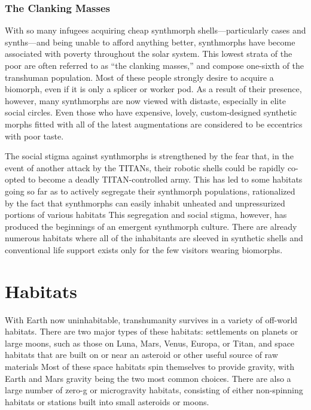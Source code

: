 \subsubsection{The Clanking Masses}

With so many infugees acquiring cheap synthmorph 
shells—particularly cases and synths—and being 
unable to afford anything better, synthmorphs have 
become associated with poverty throughout the solar 
system. This lowest strata of the poor are often referred 
to as ``the clanking masses,'' and compose one-sixth 
of the transhuman population. Most of these people 
strongly desire to acquire a biomorph, even if it is only 
a splicer or worker pod. As a result of their presence, 
however, many synthmorphs are now viewed with 
distaste, especially in elite social circles. Even those 
who have expensive, lovely, custom-designed synthetic 
morphs fitted with all of the latest augmentations are 
considered to be eccentrics with poor taste.

The social stigma against synthmorphs is strengthened
by the fear that, in the event of another attack
by the TITANs, their robotic shells could be rapidly 
co-opted to become a deadly TITAN-controlled army. 
This has led to some habitats going so far as to actively
segregate their synthmorph populations, rationalized
by the fact that synthmorphs can easily inhabit
unheated and unpressurized portions of various habitats
This segregation and social stigma, however, has
produced the beginnings of an emergent synthmorph 
culture. There are already numerous habitats where 
all of the inhabitants are sleeved in synthetic shells 
and conventional life support exists only for the few 
visitors wearing biomorphs.

\section{Habitats}

With Earth now uninhabitable, transhumanity survives
in a variety of off-world habitats. There are two
major types of these habitats: settlements on planets 
or large moons, such as those on Luna, Mars, Venus, 
Europa, or Titan, and space habitats that are built on 
or near an asteroid or other useful source of raw materials
Most of these space habitats spin themselves
to provide gravity, with Earth and Mars gravity being 
the two most common choices. There are also a large 
number of zero-g or microgravity habitats, consisting 
of either non-spinning habitats or stations built into 
small asteroids or moons.

